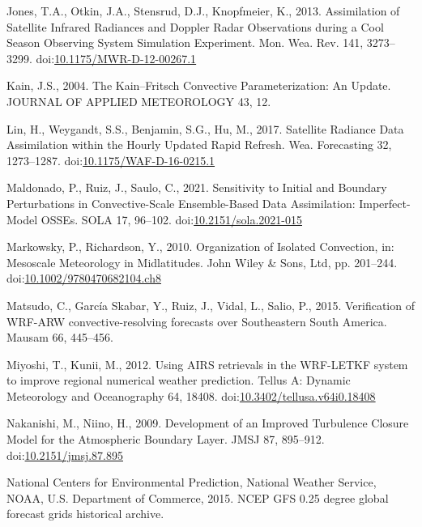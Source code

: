 \documentclass[final,5p,times,twocolumn,authoryear]{elsarticle} %
\begin{document}
\leavevmode\hypertarget{ref-jones2013}{}%
Jones, T.A., Otkin, J.A., Stensrud, D.J., Knopfmeier, K., 2013. Assimilation of Satellite Infrared Radiances and Doppler Radar Observations during a Cool Season Observing System Simulation Experiment. Mon. Wea. Rev. 141, 3273--3299. doi:\href{https://doi.org/10.1175/MWR-D-12-00267.1}{10.1175/MWR-D-12-00267.1}

\leavevmode\hypertarget{ref-kain2004}{}%
Kain, J.S., 2004. The Kain--Fritsch Convective Parameterization: An Update. JOURNAL OF APPLIED METEOROLOGY 43, 12.

\leavevmode\hypertarget{ref-lin2017a}{}%
Lin, H., Weygandt, S.S., Benjamin, S.G., Hu, M., 2017. Satellite Radiance Data Assimilation within the Hourly Updated Rapid Refresh. Wea. Forecasting 32, 1273--1287. doi:\href{https://doi.org/10.1175/WAF-D-16-0215.1}{10.1175/WAF-D-16-0215.1}

\leavevmode\hypertarget{ref-maldonado2021}{}%
Maldonado, P., Ruiz, J., Saulo, C., 2021. Sensitivity to Initial and Boundary Perturbations in Convective-Scale Ensemble-Based Data Assimilation: Imperfect-Model OSSEs. SOLA 17, 96--102. doi:\href{https://doi.org/10.2151/sola.2021-015}{10.2151/sola.2021-015}

\leavevmode\hypertarget{ref-markowsky2010}{}%
Markowsky, P., Richardson, Y., 2010. Organization of Isolated Convection, in: Mesoscale Meteorology in Midlatitudes. John Wiley \& Sons, Ltd, pp. 201--244. doi:\href{https://doi.org/10.1002/9780470682104.ch8}{10.1002/9780470682104.ch8}

\leavevmode\hypertarget{ref-matsudo2015}{}%
Matsudo, C., García Skabar, Y., Ruiz, J., Vidal, L., Salio, P., 2015. Verification of WRF-ARW convective-resolving forecasts over Southeastern South America. Mausam 66, 445--456.

\leavevmode\hypertarget{ref-miyoshi2012a}{}%
Miyoshi, T., Kunii, M., 2012. Using AIRS retrievals in the WRF-LETKF system to improve regional numerical weather prediction. Tellus A: Dynamic Meteorology and Oceanography 64, 18408. doi:\href{https://doi.org/10.3402/tellusa.v64i0.18408}{10.3402/tellusa.v64i0.18408}

\leavevmode\hypertarget{ref-nakanishi2009}{}%
Nakanishi, M., Niino, H., 2009. Development of an Improved Turbulence Closure Model for the Atmospheric Boundary Layer. JMSJ 87, 895--912. doi:\href{https://doi.org/10.2151/jmsj.87.895}{10.2151/jmsj.87.895}

\leavevmode\hypertarget{ref-cisl_rda_ds084.1}{}%
National Centers for Environmental Prediction, National Weather Service, NOAA, U.S. Department of Commerce, 2015. NCEP GFS 0.25 degree global forecast grids historical archive.
\end{document}
